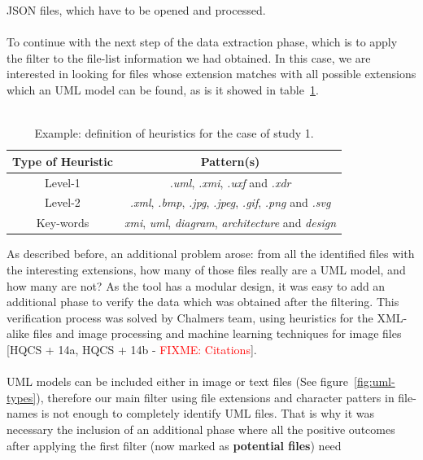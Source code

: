 \documentclass[a4paper, 12pt]{book}
\begin{document}
JSON files, which have to be opened and processed.\\\\
To continue with the next step of the data extraction phase, which is to apply the filter to the file-list information
we had obtained. In this case, we are interested in looking for files whose extension matches with all possible extensions which an
UML model can be found, as is it showed in table~\ref{table:heuristics-cs1-example}.\\\\
\begin{table}[]
\centering
\caption{Example: definition of heuristics for the case of study 1.}
\label{table:heuristics-cs1-example}
\begin{tabular}{|c|c|}
\hline
\textbf{Type of Heuristic} & \textbf{Pattern(s)}                                                                                           \\ \hline
Level-1                    & \textit{.uml}, \textit{.xmi}, \textit{.uxf} and \textit{.xdr}                                                 \\ \hline
Level-2                    & \textit{.xml}, \textit{.bmp}, \textit{.jpg}, \textit{.jpeg}, \textit{.gif}, \textit{.png} and \textit{.svg}   \\ \hline
Key-words                  & \textit{xmi}, \textit{uml}, \textit{diagram}, \textit{architecture} and \textit{design}                       \\ \hline
\end{tabular}
\end{table}
As described before, an additional problem arose: from all the identified files with the interesting extensions, how many of those files
really are a UML model, and how many are not? As the tool has a modular design, it was easy to add an additional phase to verify the data
which was obtained after the filtering. This verification process was solved by Chalmers team, using heuristics for the XML-alike files
and image processing and machine learning techniques for image files [HQCS + 14a, HQCS + 14b - \textcolor{red}{FIXME: Citations}].\\\\
UML models can be included either in image or text files (See figure~\ref{fig:uml-types}), therefore our main filter using file extensions
and character patters in file-names is not enough to completely identify UML files. That is why it was necessary the inclusion of
an additional phase where all the positive outcomes after applying the first filter (now marked as \textbf{potential files}) need
\end{document}
